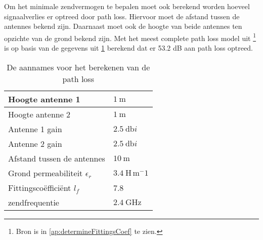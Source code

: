 Om het minimale zendvermogen te bepalen moet ook berekend worden hoeveel signaalverlies er optreed door path loss. Hiervoor moet de afstand tussen de antennes bekend zijn. Daarnaast moet ook de hoogte van beide antennes ten opzichte van de grond bekend zijn. Met het meest complete path loss model uit \cite{determineFittingsCoef}
\footnote{Bron \cite{determineFittingsCoef} is in \cref{ap:determineFittingsCoef} te zien.}
is op basis van de gegevens uit \cref{tab:gegevensCalcPathLoss} berekend dat er 53.2 dB aan path loss optreed.
\begin{table}[!htbp]
    \centering
    \begin{tabular}{l|l}
        Hoogte antenne 1                    & $\qty{1  }{\meter}$               \\\hline
        Hoogte antenne 2                    & $\qty{1  }{\meter}$               \\\hline
        Antenne 1 gain                      & $\qty{2.5}{\decibel i}$           \\\hline
        Antenne 2 gain                      & $\qty{2.5}{\decibel i}$           \\\hline
        Afstand tussen de antennes          & $\qty{10 }{\meter}$               \\\hline
        Grond permeabiliteit $\epsilon_r$   & $\qty{3.4}{\henry\,\meter^-1}$    \\\hline
        Fittingscoëfficiënt $l_f$           & 7.8                               \\\hline
        zendfrequentie                      & $\qty{2.4}{\giga\hertz}$
    \end{tabular}
    \caption{De aannames voor het berekenen van de path loss}
    \label{tab:gegevensCalcPathLoss}
\end{table}

